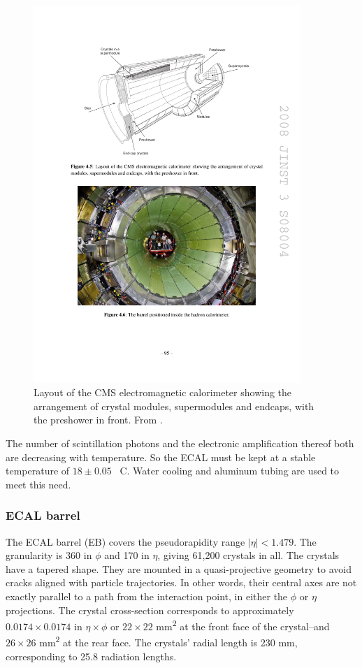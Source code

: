 \begin{figure}
\centering
\includegraphics[width=0.9\textwidth]{figures/ecal_layout.pdf}
\caption{Layout of the CMS electromagnetic calorimeter showing the arrangement of crystal
modules, supermodules and endcaps, with the preshower in front. From \cite{Chatrchyan:2008aa}.}
\label{fig:ecal_layout}
\end{figure}

The number of scintillation photons and the electronic amplification thereof both are decreasing with temperature. 
So the ECAL must be kept at a stable temperature of $18\pm0.05$\textdegree~ C.
Water cooling and aluminum tubing are used to meet this need.

\subsubsection{ECAL barrel}
The ECAL barrel (EB) covers the pseudorapidity range $|\eta|<1.479$.
The granularity is 360 in $\phi$ and 170 in $\eta$, giving 61,200 crystals in all.
The crystals have a tapered shape.
They are mounted in a quasi-projective geometry to avoid cracks aligned with particle trajectories.
In other words, their central axes are not exactly parallel to a path from the interaction point, 
in either the $\phi$ or $\eta$ projections.
The crystal cross-section corresponds to approximately $0.0174 \times 0.0174$ in $\eta\times\phi$
or $22 \times 22$ mm\textsuperscript{2} at the front face of the crystal--and $26 \times 26$ mm\textsuperscript{2}
at the rear face.
The crystals' radial length is 230 mm, corresponding to 25.8 radiation lengths.

